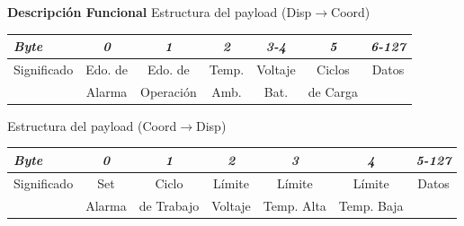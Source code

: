 \documentclass[aspectratio=43, handout]{beamer}
\begin{document}
\begin{frame}{\textbf{\LARGE{Descripción Funcional}}}
\fontsize{15pt}{15}\selectfont
	\centering
	\noindent Estructura del payload (Disp$\rightarrow$Coord)
	\vspace{15px}
\begin{table}[ht]
	\centering
	\fontsize{8pt}{8}\selectfont

	\begin{tabular}{@{} l *6c @{}}    %
	\hline
		\emph{\textbf{Byte}} & \emph{\textbf{0}} & \emph{\textbf{1}} & \emph{\textbf{2}} & \emph{\textbf{3-4}} & \emph{\textbf{5}} & \emph{\textbf{6-127}}\\
		\hline
		Significado & Edo. de & Edo. de & Temp. & Voltaje & Ciclos & Datos\\
		 & Alarma & Operación & Amb. & Bat. & de Carga & \\
		\hline
	\end{tabular}
	\label{tab:dispcoor}
\end{table}
		\vspace{20px}
	\noindent Estructura del payload (Coord$\rightarrow$Disp)
\begin{table}[ht]
	\centering
	\fontsize{8pt}{8}\selectfont
		\vspace{15px}
	\begin{tabular}{@{} l *6c @{}}    %
	\hline
		\emph{\textbf{Byte}} & \emph{\textbf{0}} & \emph{\textbf{1}} & \emph{\textbf{2}} & \emph{\textbf{3}} & \emph{\textbf{4}} & \emph{\textbf{5-127}}\\
		\hline
		Significado & Set & Ciclo & Límite & Límite & Límite & Datos\\
		 & Alarma & de Trabajo & Voltaje & Temp. Alta & Temp. Baja & \\
		\hline
	\end{tabular}
	\label{tab:coordisp}
\end{table}
\end{frame}
\end{document}
